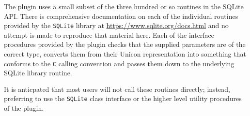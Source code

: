 The plugin uses a small subset of the three hundred or so routines in the SQLite
API. There is comprehensive documentation on each of the individual routines
provided by the \texttt{SQLite} library at
\url{https://www.sqlite.org/docs.html} and no attempt is made to reproduce that
material here.  Each of the interface procedures provided by the plugin checks
that the supplied parameters are of the correct type, converts them from their
Unicon representation into something that conforms to the \texttt{C} calling
convention and passes them down to the underlying SQLite library routine.

It is anticpated that most users will not call these routines directly; instead,
preferring to use the \texttt{SQLite} class interface or the higher level
utility procedures of the plugin.

\medskip
\noindent
{}%
%
\tablelasttail{\hline}%
